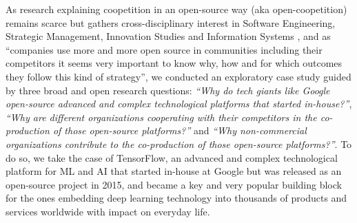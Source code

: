 \documentclass[CHICAGO,Times1COL]{WileyNJDv5} %
\begin{document}
As research explaining coopetition in an open-source way (aka open-coopetition) remains scarce but gathers cross-disciplinary interest in Software Engineering, Strategic Management, Innovation Studies and Information Systems \citep[e.g.,][]{teixeira2023icis,NguyenDucCruzes_et_al2019,RothLeydesdorff_et_al2020,RoyChesbrough_et_al2018}, and as ``companies use more and more open source in communities including their competitors it seems very important to know why, how and for which outcomes they follow this kind of strategy''\citep{CzakonSrivastava_et_al2020}, we conducted an exploratory case study guided by three broad and open research questions:  \textit{``Why do tech giants like Google open-source advanced and complex technological platforms that started in-house?''}, \textit{``Why are different organizations cooperating with their competitors in the co-production of those open-source platforms?''} and \textit{``Why non-commercial organizations contribute to the co-production of those open-source platforms?''}. To do so, we take the case of TensorFlow, an advanced and complex technological platform for \ac{ML} and \ac{AI} that started in-house at Google but was released as an open-source project in 2015, and became a key and very popular building block for the ones embedding deep learning technology into thousands of products and services worldwide with impact on everyday life. 


\end{document}
